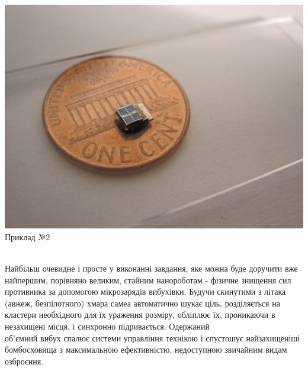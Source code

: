 \documentclass[aspectratio=169]{beamer}
\begin{document}
{\begin{frame}
\begin{minipage}[h]{0.3\linewidth}
\end{minipage}
\hfill
\begin{minipage}[h]{0.38\linewidth}
\begin{center}
\includegraphics[width=1\linewidth]{nano1.png} \\ Приклад №2
\end{center}
\end{minipage}\\
\small Найбільш очевидне і просте у виконанні завдання, яке можна буде доручити вже найпершим, порівняно великим, стайним нанороботам - фізичне знищення сил противника за допомогою мікрозарядів вибухівки. Будучи скинутими з літака (авжеж, безпілотного) хмара самеа автоматично шукає ціль, розділяється на кластери необхідного для їх ураження розміру, обліплює їх, проникаючи в незахищені місця, і синхронно підривається. Одержаний \\ об'ємний вибух спалює системи управління технікою і спустошує найзахищеніші бомбосховища з максимальною ефективністю, недоступною звичайним видам озброєння.
\end{frame}
}
\end{document}
